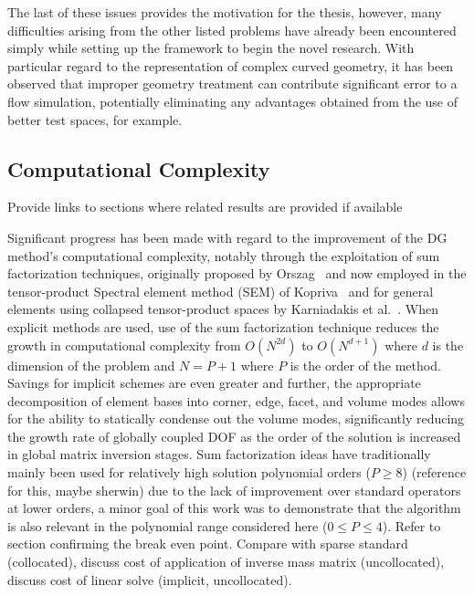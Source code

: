 \documentclass[12pt,Bold,letterpaper,TexShade]{mcgilletdclass}
\numberwithin{equation}{section}
\begin{document}
The last of these issues provides the motivation for the thesis, however, many difficulties arising from the other listed problems have already been encountered simply while setting up the framework to begin the novel research. With particular regard to the representation of complex curved geometry, it has been observed that improper geometry treatment can contribute significant error to a flow simulation, potentially eliminating any advantages obtained from the use of better test spaces, for example.

\subsection{Computational Complexity}
\label{sec:Comp_comp}
{\color{red} Provide links to sections where related results are provided if available}

Significant progress has been made with regard to the improvement of the DG method's computational complexity, notably through the exploitation of sum factorization techniques, originally proposed by Orszag~\cite{orszag1980} and now employed in the tensor-product Spectral element method (SEM) of Kopriva~\cite{kopriva2009} and for general elements using collapsed tensor-product spaces by Karniadakis et al.~\cite{karniadakis1999}. When explicit methods are used, use of the sum factorization technique reduces the growth in computational complexity from $O(N^{2d})$ to $O(N^{d+1})$ where $d$ is the dimension of the problem and $N = P+1$ where $P$ is the order of the method. Savings for implicit schemes are even greater and further, the appropriate decomposition of element bases into corner, edge, facet, and volume modes allows for the ability to statically condense out the volume modes, significantly reducing the growth rate of globally coupled DOF as the order of the solution is increased in global matrix inversion stages. Sum factorization ideas have traditionally mainly been used for relatively high solution polynomial orders ($P \geq 8$) {\color{red} (reference for this, maybe sherwin)} due to the lack of improvement over standard operators at lower orders, a minor goal of this work was to demonstrate that the algorithm is also relevant in the polynomial range considered here ($0 \leq P \leq 4$). {\color{red} Refer to section confirming the break even point. Compare with sparse standard (collocated), discuss cost of application of inverse mass matrix (uncollocated), discuss cost of linear solve (implicit, uncollocated).}
\end{document}
